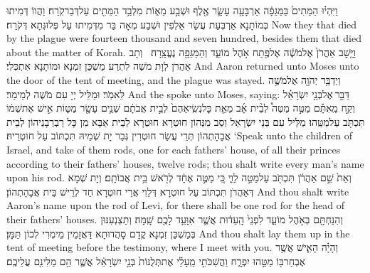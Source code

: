 {וַיִּהְי֗וּ הַמֵּתִים֙ בַּמַּגֵּפָ֔ה אַרְבָּעָ֥ה עָשָׂ֛ר אֶ֖לֶף וּשְׁבַ֣ע מֵא֑וֹת מִלְּבַ֥ד הַמֵּתִ֖ים עַל\maqqaf דְּבַר\maqqaf קֹֽרַח׃}
{וַהֲווֹ דְּמִיתוּ בְּמוֹתָנָא אַרְבְּעַת עֲשַׂר אַלְפִין וּשְׁבַע מְאָה בַּר מִדְּמִיתוּ עַל פְּלוּגְּתָא דְּקֹרַח׃}
{Now they that died by the plague were fourteen thousand and seven hundred, besides them that died about the matter of Korah.}{}
{וַיָּ֤שׇׁב אַהֲרֹן֙ אֶל\maqqaf מֹשֶׁ֔ה אֶל\maqqaf פֶּ֖תַח אֹ֣הֶל מוֹעֵ֑ד וְהַמַּגֵּפָ֖ה נֶעֱצָֽרָה׃ \petucha }
{וְתָב אַהֲרֹן לְוָת מֹשֶׁה לִתְרַע מַשְׁכַּן זִמְנָא וּמוֹתָנָא אִתְכְּלִי׃}
{And Aaron returned unto Moses unto the door of the tent of meeting, and the plague was stayed.}{}
{וַיְדַבֵּ֥ר יְהֹוָ֖ה אֶל\maqqaf מֹשֶׁ֥ה לֵּאמֹֽר׃}
{וּמַלֵּיל יְיָ עִם מֹשֶׁה לְמֵימַר׃}
{And the \lord\space spoke unto Moses, saying:}{}
{דַּבֵּ֣ר \legarmeh  אֶל\maqqaf בְּנֵ֣י יִשְׂרָאֵ֗ל וְקַ֣ח מֵֽאִתָּ֡ם מַטֶּ֣ה מַטֶּה֩ לְבֵ֨ית אָ֜ב מֵאֵ֤ת כׇּל\maqqaf נְשִֽׂיאֵהֶם֙ לְבֵ֣ית אֲבֹתָ֔ם שְׁנֵ֥ים עָשָׂ֖ר מַטּ֑וֹת אִ֣ישׁ אֶת\maqqaf שְׁמ֔וֹ תִּכְתֹּ֖ב עַל\maqqaf מַטֵּֽהוּ׃}
{מַלֵּיל עִם בְּנֵי יִשְׂרָאֵל וְסַב מִנְּהוֹן חוּטְרָא חוּטְרָא לְבֵית אַבָּא מִן כָּל רַבְרְבָנֵיהוֹן לְבֵית אֲבָהָתְהוֹן תְּרֵי עֲשַׂר חוּטְרִין גְּבַר יָת שְׁמֵיהּ תִּכְתּוֹב עַל חוּטְרֵיהּ׃}
{‘Speak unto the children of Israel, and take of them rods, one for each fathers’ house, of all their princes according to their fathers’ houses, twelve rods; thou shalt write every man’s name upon his rod.}{}
{וְאֵת֙ שֵׁ֣ם אַהֲרֹ֔ן תִּכְתֹּ֖ב עַל\maqqaf מַטֵּ֣ה לֵוִ֑י כִּ֚י מַטֶּ֣ה אֶחָ֔ד לְרֹ֖אשׁ בֵּ֥ית אֲבוֹתָֽם׃}
{וְיָת שְׁמָא דְּאַהֲרֹן תִּכְתּוֹב עַל חוּטְרָא דְּלֵוִי אֲרֵי חוּטְרָא חַד לְרֵישׁ בֵּית אֲבָהָתְהוֹן׃}
{And thou shalt write Aaron’s name upon the rod of Levi, for there shall be one rod for the head of their fathers’ houses.}{}
{וְהִנַּחְתָּ֖ם בְּאֹ֣הֶל מוֹעֵ֑ד לִפְנֵי֙ הָֽעֵד֔וּת אֲשֶׁ֛ר אִוָּעֵ֥ד לָכֶ֖ם שָֽׁמָּה׃}
{וְתַצְנְעִנּוּן בְּמַשְׁכַּן זִמְנָא קֳדָם סָהֲדוּתָא דַּאֲזָמֵין מֵימְרִי לְכוֹן תַּמָּן׃}
{And thou shalt lay them up in the tent of meeting before the testimony, where I meet with you.}{}
{וְהָיָ֗ה הָאִ֛ישׁ אֲשֶׁ֥ר אֶבְחַר\maqqaf בּ֖וֹ מַטֵּ֣הוּ יִפְרָ֑ח וַהֲשִׁכֹּתִ֣י מֵֽעָלַ֗י אֶת\maqqaf תְּלֻנּוֹת֙ בְּנֵ֣י יִשְׂרָאֵ֔ל אֲשֶׁ֛ר הֵ֥ם מַלִּינִ֖ם עֲלֵיכֶֽם׃}

